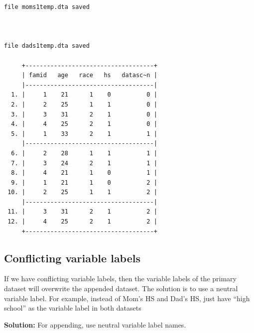 \documentclass[
]{book}
\begin{document}
\begin{verbatim}
file moms1temp.dta saved



file dads1temp.dta saved

     +------------------------------------+
     | famid   age   race   hs   datasc~n |
     |------------------------------------|
  1. |     1    21      1    0          0 |
  2. |     2    25      1    1          0 |
  3. |     3    31      2    1          0 |
  4. |     4    25      2    1          0 |
  5. |     1    33      2    1          1 |
     |------------------------------------|
  6. |     2    28      1    1          1 |
  7. |     3    24      2    1          1 |
  8. |     4    21      1    0          1 |
  9. |     1    21      1    0          2 |
 10. |     2    25      1    1          2 |
     |------------------------------------|
 11. |     3    31      2    1          2 |
 12. |     4    25      2    1          2 |
     +------------------------------------+
\end{verbatim}

\subsection{Conflicting variable labels}\label{conflicting-variable-labels}

If we have conflicting variable labels, then the variable labels of the primary dataset will overwrite the appended dataset. The solution is to use a neutral variable label.
For example, instead of Mom's HS and Dad's HS, just have ``high school'' as the variable label in both datasets

\textbf{Solution:} For appending, use neutral variable label names.
\end{document}
